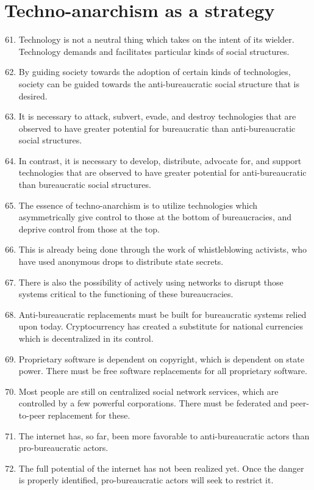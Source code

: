 \documentclass{article}
\begin{document}
\section{Techno-anarchism as a strategy}
\begin{enumerate}
\setcounter{enumi}{60}
\item Technology is not a neutral thing which takes on the intent of its wielder. Technology demands and facilitates particular kinds of social structures.
\item By guiding society towards the adoption of certain kinds of technologies, society can be guided towards the anti-bureaucratic social structure that is desired.
\item It is necessary to attack, subvert, evade, and destroy technologies that are observed to have greater potential for bureaucratic than anti-bureaucratic social structures.
\item In contrast, it is necessary to develop, distribute, advocate for, and support technologies that are observed to have greater potential for anti-bureaucratic than bureaucratic social structures.
\item The essence of techno-anarchism is to utilize technologies which asymmetrically give control to those at the bottom of bureaucracies, and deprive control from those at the top.
\item This is already being done through the work of whistleblowing activists, who have used anonymous drops to distribute state secrets.
\item There is also the possibility of actively using networks to disrupt those systems critical to the functioning of these bureaucracies.
\item Anti-bureaucratic replacements must be built for bureaucratic systems relied upon today. Cryptocurrency has created a substitute for national currencies which is decentralized in its control.
\item Proprietary software is dependent on copyright, which is dependent on state power. There must be free software replacements for all proprietary software.
\item Most people are still on centralized social network services, which are controlled by a few powerful corporations. There must be federated and peer-to-peer replacement for these.
\item The internet has, so far, been more favorable to anti-bureaucratic actors than pro-bureaucratic actors.
\item The full potential of the internet has not been realized yet. Once the danger is properly identified, pro-bureaucratic actors will seek to restrict it.

\end{enumerate}
\end{document}
